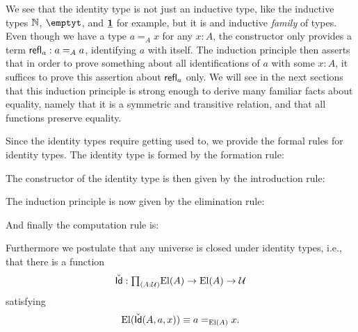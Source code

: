 \begin{rmk}
  We see that the identity type is not just an inductive type, like the inductive types $\N$, $\emptyt$, and $\unit$ for example, but it is and inductive \emph{family} of types. Even though we have a type $a=_A x$ for any $x:A$, the constructor only provides a term $\refl{a}:a=_A a$, identifying $a$ with itself. The induction principle then asserts that in order to prove something about all identifications of $a$ with some $x:A$, it suffices to prove this assertion about $\refl{a}$ only. We will see in the next sections that this induction principle is strong enough to derive many familiar facts about equality, namely that it is a symmetric and transitive relation, and that all functions preserve equality.
\end{rmk}

\begin{rmk}
  Since the identity types require getting used to, we provide the formal rules
  for identity types. The identity type is formed by the formation rule:
  \begin{prooftree}
  \end{prooftree}
  The constructor of the identity type is then given by the introduction rule:
  \begin{prooftree}
  \end{prooftree}
  The induction principle is now given by the elimination rule:
  \begin{prooftree}
  \end{prooftree}
  And finally the computation rule is:
  \begin{prooftree}
  \end{prooftree}
  Furthermore we postulate that any universe is closed under identity types, i.e., that there is a function
  \begin{equation*}
    \check{\mathsf{Id}}:\prd{A:\UU}\mathrm{El}(A)\to\mathrm{El}(A)\to\UU
  \end{equation*}
  satisfying
  \begin{equation*}
    \mathrm{El}(\check{\mathsf{Id}}(A,a,x))\jdeq a=_{\mathrm{El}(A)} x.
  \end{equation*}
\end{rmk}

